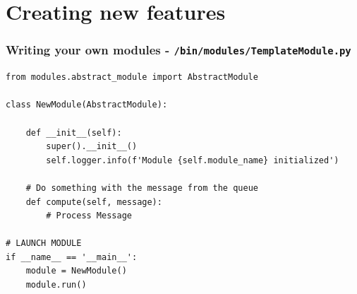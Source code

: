 \documentclass[aspectratio=169]{beamer}
\begin{document}
\section{Creating new features}


\lstset{style=code}
\begin{frame}[fragile]
    \frametitle{Writing your own modules - \texttt{/bin/modules/TemplateModule.py}}
    \begin{lstlisting}
from modules.abstract_module import AbstractModule

class NewModule(AbstractModule):

	def __init__(self):
        super().__init__()
		self.logger.info(f'Module {self.module_name} initialized')

	# Do something with the message from the queue
	def compute(self, message):
		# Process Message

# LAUNCH MODULE
if __name__ == '__main__':
    module = NewModule()
    module.run()

    \end{lstlisting}
\end{frame}
\end{document}
